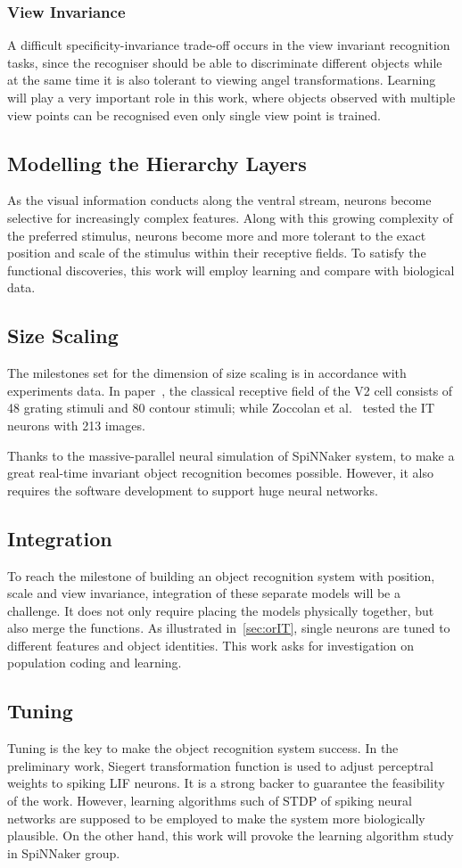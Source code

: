 \subsubsection{View Invariance}
A difficult specificity-invariance trade-off occurs in the view invariant recognition tasks, since the recogniser should be able to discriminate different objects while at the same time it is also tolerant to viewing angel transformations.
Learning will play a very important role in this work, where objects observed with multiple view points can be recognised even only single view point is trained.
\subsection{Modelling the Hierarchy Layers}
As the visual information conducts along the ventral stream, neurons become selective for increasingly complex features. 
Along with this growing complexity of the preferred stimulus, neurons become more and more tolerant to the exact position and scale of the stimulus within their receptive fields.
To satisfy the functional discoveries, this work will employ learning and compare with biological data.
\subsection{Size Scaling}
The milestones set for the dimension of size scaling is in accordance with experiments data.
In paper~\cite{hegde2004temporal}, the classical receptive field of the V2 cell consists of 48 grating stimuli and 80 contour stimuli; while Zoccolan et al.~\cite{zoccolan2007trade} tested the IT neurons with 213 images.

Thanks to the massive-parallel neural simulation of SpiNNaker system, to make a great real-time invariant object recognition becomes possible.
However, it also requires the software development to support huge neural networks.  
\subsection{Integration}
To reach the milestone of building an object recognition system with position, scale and view invariance, integration of these separate models will be a challenge.
It does not only require placing the models physically together, but also merge the functions.
As illustrated in~\ref{sec:orIT}, single neurons are tuned to different features and object identities.
This work asks for investigation on population coding and learning. 
\subsection{Tuning}
Tuning is the key to make the object recognition system success.
In the preliminary work, Siegert transformation function is used to adjust perceptral weights to spiking LIF neurons.
It is a strong backer to guarantee the feasibility of the work.
However, learning algorithms such of STDP of spiking neural networks are supposed to be employed to make the system more biologically plausible.
On the other hand, this work will provoke the learning algorithm study in SpiNNaker group.
